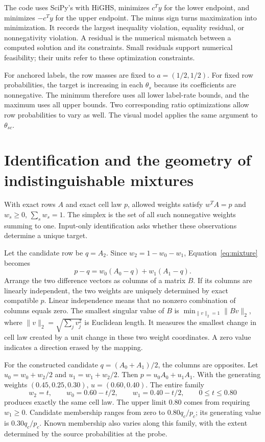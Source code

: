 \documentclass[11pt,a4paper]{report}
\newcommand{\code}[1]{\texttt{\detokenize{#1}}}
\begin{document}
The code uses SciPy's \code{linprog} with HiGHS, minimizes $c^Ty$ for the lower endpoint, and minimizes $-c^Ty$ for the upper endpoint. The minus sign turns maximization into minimization. It records the largest inequality violation, equality residual, or nonnegativity violation. A residual is the numerical mismatch between a computed solution and its constraints. Small residuals support numerical feasibility; their units refer to these optimization constraints.

For anchored labels, the row masses are fixed to $a=(1/2,1/2)$. For fixed row probabilities, the target is increasing in each $\theta_s$ because its coefficients are nonnegative. The minimum therefore uses all lower label-rate bounds, and the maximum uses all upper bounds. Two corresponding ratio optimizations allow row probabilities to vary as well. The visual model applies the same argument to $\theta_{sc}$.

\section{Identification and the geometry of indistinguishable mixtures}
With exact rows $A$ and exact cell law $p$, allowed weights satisfy $w^TA=p$ and $w_s\geq0$, $\sum_sw_s=1$. The simplex is the set of all such nonnegative weights summing to one. Input-only identification asks whether these observations determine a unique target.

Let the candidate row be $q=A_2$. Since $w_2=1-w_0-w_1$, Equation~\eqref{eq:mixture} becomes
\begin{equation}
p-q=w_0(A_0-q)+w_1(A_1-q).
\end{equation}
Arrange the two difference vectors as columns of a matrix $B$. If its columns are linearly independent, the two weights are uniquely determined by exact compatible $p$. Linear independence means that no nonzero combination of columns equals zero. The smallest singular value of $B$ is $\min_{\|v\|_2=1}\|Bv\|_2$, where $\|v\|_2=\sqrt{\sum_jv_j^2}$ is Euclidean length. It measures the smallest change in cell law created by a unit change in these two weight coordinates. A zero value indicates a direction erased by the mapping.

For the constructed candidate $q=(A_0+A_1)/2$, the columns are opposites. Let $u_0=w_0+w_2/2$ and $u_1=w_1+w_2/2$. Then $p=u_0A_0+u_1A_1$. With the generating weights $(0.45,0.25,0.30)$, $u=(0.60,0.40)$. The entire family
\begin{equation}
w_2=t,\qquad w_0=0.60-t/2,\qquad w_1=0.40-t/2,\qquad 0\leq t\leq0.80
\label{eq:family}
\end{equation}
produces exactly the same cell law. The upper limit $0.80$ comes from requiring $w_1\geq0$. Candidate membership ranges from zero to $0.80q_c/p_c$; its generating value is $0.30q_c/p_c$. Known membership also varies along this family, with the extent determined by the source probabilities at the probe.
\end{document}
